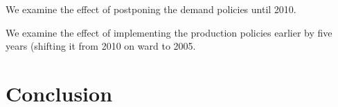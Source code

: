 \documentclass[12pt, letter]{article}
\renewcommand{\thesection}{\arabic{section}}
\renewcommand{\thesubsection}{\arabic{section}.\arabic{subsection}}
\renewcommand{\thesubsubsection}{\arabic{section}.\arabic{subsection}.\arabic{subsubsection}}
\renewcommand*\thetable{\arabic{table}}
\renewcommand*\thefigure{\arabic{figure}}
\begin{document}
We examine the effect of postponing the demand policies until 2010.

We examine the effect of implementing the production policies earlier by five years (shifting it from 2010 on ward to 2005.

\section{Conclusion}


\newpage

\small
\singlespacing



\newpage
\setcounter{table}{0} \renewcommand{\thetable}{\Alph{section}.\arabic{table}}
\setcounter{figure}{0} \renewcommand{\thefigure}{\Alph{section}.\arabic{figure}}
\setcounter{section}{0} \renewcommand{\thesection}{\Alph{section}}
\setcounter{subsection}{0} \renewcommand{\thesubsection}{\Alph{section}.\arabic{subsection}}
\setcounter{subsubsection}{0} \renewcommand{\thesubsubsection}{\Alph{section}.\arabic{subsection}.\arabic{subsubsection}}
\setcounter{equation}{0} \renewcommand{\theequation}{\Alph{section}.\arabic{equation}}

\appendix
\addappheadtotoc
\end{document}
